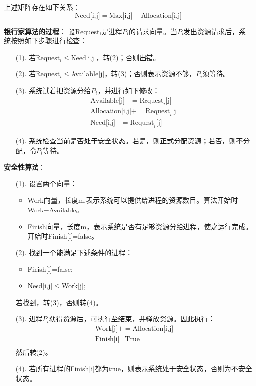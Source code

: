 \documentclass[12pt, a4paper, oneside]{ctexart}
\begin{document}
上述矩阵存在如下关系：
\begin{equation*}
    \text{Need[i,j]}=\text{Max[i,j]}-\text{Allocation[i,j]}
\end{equation*}

\vspace{10pt}

\textbf{银行家算法的过程}：
设Request$_i$是进程$P_i$的请求向量。当$P_i$发出资源请求后，系统按照如下步骤进行检查：

\begin{enumerate}
  \item [(1). ] 若Request$_i\leq$Need[i,j]，转(2)；否则出错。
  \item [(2). ] 若Request$_i\leq$Available[j]，转(3)；否则表示资源不够，$P_i$须等待。
  \item [(3). ] 系统试着把资源分给$P_i$，并进行如下修改：
  \begin{gather*}
    \text{Available[j]}-=\text{Request}_i\text{[j]}\\
    \text{Allocation[i,j]}+=\text{Request}_i\text{[j]}\\
    \text{Need[i,j]}-=\text{Request}_i\text{[j]}
  \end{gather*}
  \item [(4). ] 系统检查当前是否处于安全状态。若是，则正式分配资源；若否，则不分配，令$P_i$等待。
\end{enumerate}

\textbf{安全性算法}：

\begin{enumerate}
  \item [(1). ] 设置两个向量：
  \begin{itemize}
    \item Work向量，长度m,表示系统可以提供给进程的资源数目。算法开始时Work=Available。
    \item Finish向量，长度m，表示系统是否有足够资源分给进程，使之运行完成。开始时Finish[i]=false。
  \end{itemize}
  \item [(2). ] 找到一个能满足下述条件的进程：
  \begin{itemize}
    \item Finish[i]=false;
    \item Need[i,j]$\leq$Work[j];
  \end{itemize}
  若找到，转(3)，否则转(4)。
  \item [(3). ] 进程$P_i$获得资源后，可执行至结束，并释放资源。因此执行：
  \begin{gather*}
    \text{Work[j]}+=\text{Allocation[i,j]}\\
    \text{Finish[i]}=\text{True}\\
  \end{gather*}
  然后转(2)。
  \item [(4). ] 若所有进程的Finish[i]都为true，则表示系统处于安全状态，否则为不安全状态。
\end{enumerate}
\end{document}
